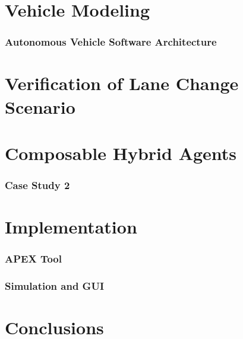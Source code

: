 \documentclass[11pt]{article}              %
\begin{document}
\part{Vehicle Modeling}
\section{Autonomous Vehicle Software Architecture}


\pagebreak


\part{Verification of Lane Change Scenario}


\pagebreak


\part{Composable Hybrid Agents}



\section{Case Study 2}
\pagebreak


\part{Implementation}
\section{APEX Tool}
\label{ref:tool}

\section{Simulation and GUI}
\pagebreak


\part{Conclusions}

\pagebreak





 
\end{document}
